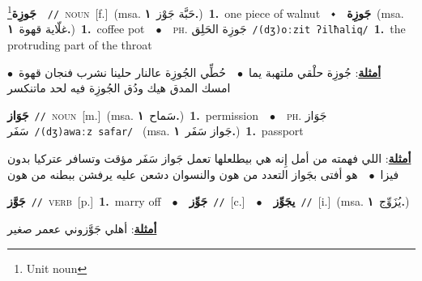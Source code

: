 \documentclass[10pt,a4paper,twoside]{article} %
\begin{document}
\begin{multicols}{2}
{\setlength\topsep{0pt}\textbf{\foreignlanguage{arabic}{جَوزِة}}\footnote{Unit noun}\ \ {\color{gray}\texttt{//}\color{black}}\ \textsc{noun}\ [f.]\ \color{gray}(msa. \foreignlanguage{arabic}{حَبَّة جَوْز}~\foreignlanguage{arabic}{\textbf{١.}})\color{black}\ \textbf{1.}~one piece of walnut\ \ $\smblkdiamond$\ \ \setlength\topsep{0pt}\textbf{\foreignlanguage{arabic}{جَوزِة}}\ \color{gray}(msa. \foreignlanguage{arabic}{غلّاية قهوة}~\foreignlanguage{arabic}{\textbf{١.}})\color{black}\ \textbf{1.}~coffee pot\ \ $\bullet$\ \ \textsc{ph.} \color{gray} \foreignlanguage{arabic}{جَوزِة الحَلِق}\color{black}\ {\color{gray}\texttt{/{\sffamily (dʒ)oːzit ʔilħaliq}/}\color{black}}\ \textbf{1.}~the protruding part of the throat\  \begin{flushright}\color{gray}\foreignlanguage{arabic}{\textbf{\underline{\foreignlanguage{arabic}{أمثلة}}}: جُوزِة حلْقي ملتهبة يما\ $\bullet$\ \  حُطِّي الجُوزِة عالنار حلينا نشرب فنجان قهوة\ $\bullet$\ \  امسك المدق هيك ودُق الجُوزِة فيه لحد ماتنكسر}\end{flushright}\color{black}} \vspace{2mm}

{\setlength\topsep{0pt}\textbf{\foreignlanguage{arabic}{جَوَاز}}\ {\color{gray}\texttt{//}\color{black}}\ \textsc{noun}\ [m.]\ \color{gray}(msa. \foreignlanguage{arabic}{سَماح}~\foreignlanguage{arabic}{\textbf{١.}})\color{black}\ \textbf{1.}~permission\ \ $\bullet$\ \ \textsc{ph.} \color{gray} \foreignlanguage{arabic}{جَوَاز سَفَر}\color{black}\ {\color{gray}\texttt{/{\sffamily (dʒ)awaːz safar}/}\color{black}}\ \color{gray} (msa. \foreignlanguage{arabic}{جَواز سَفَر}~\foreignlanguage{arabic}{\textbf{١.}})\color{black}\ \textbf{1.}~passport\  \begin{flushright}\color{gray}\foreignlanguage{arabic}{\textbf{\underline{\foreignlanguage{arabic}{أمثلة}}}: اللي فهمته من أمل إِنه هي بيطلعلها تعمل جَواز سَفَر مؤقت وتسافر عتركيا بدون فيزا\ $\bullet$\ \  هو أفتى بجَواز التعدد من هون والنسوان دشعن عليه يرفشن ببطنه من هون}\end{flushright}\color{black}} \vspace{2mm}

{\setlength\topsep{0pt}\textbf{\foreignlanguage{arabic}{جَوَّز}}\ {\color{gray}\texttt{//}\color{black}}\ \textsc{verb}\ [p.]\ \textbf{1.}~marry off\ \ $\bullet$\ \ \setlength\topsep{0pt}\textbf{\foreignlanguage{arabic}{جَوِّز}}\ {\color{gray}\texttt{//}\color{black}}\ [c.]\ \ $\bullet$\ \ \setlength\topsep{0pt}\textbf{\foreignlanguage{arabic}{يجَوِّز}}\ {\color{gray}\texttt{//}\color{black}}\ [i.]\ \color{gray}(msa. \foreignlanguage{arabic}{يُزَوِّج}~\foreignlanguage{arabic}{\textbf{١.}})\color{black}\  \begin{flushright}\color{gray}\foreignlanguage{arabic}{\textbf{\underline{\foreignlanguage{arabic}{أمثلة}}}: أهلي جَوَّزوني ععمر صغير}\end{flushright}\color{black}} \vspace{2mm}


\end{multicols}
\end{document}
